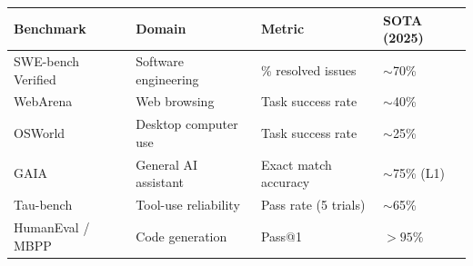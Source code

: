 \begin{tabular}{@{}lp{3.5cm}p{3.5cm}p{6cm}@{}}
\toprule
\textbf{Benchmark} & \textbf{Domain} & \textbf{Metric} & \textbf{SOTA (2025)} \\
\midrule
SWE-bench Verified & Software engineering & \% resolved issues & $\sim$70\% \\
WebArena & Web browsing & Task success rate & $\sim$40\% \\
OSWorld & Desktop computer use & Task success rate & $\sim$25\% \\
GAIA & General AI assistant & Exact match accuracy & $\sim$75\% (L1) \\
Tau-bench & Tool-use reliability & Pass rate (5 trials) & $\sim$65\% \\
HumanEval / MBPP & Code generation & Pass@1 & $>95\%$ \\
\bottomrule
\end{tabular}

